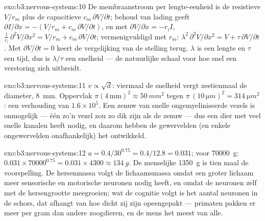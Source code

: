 \begin{solution}{exo:b3:nervous-systems:10}
De membraanstroom per lengte-eenheid is de resistieve $V/r_{m}$ plus
de capacitieve $c_{m}\,\partial V/\partial t$; behoud van lading geeft
$\partial I/\partial x = -(V/r_{m} + c_{m}\,\partial V/\partial t)$, en
met $\partial V/\partial x = -r_{i}I$, $\frac{1}{r_{i}}\,\partial^{2}V/
\partial x^{2} = V/r_{m} + c_{m}\,\partial V/\partial t$; vermenigvuldigd met
$r_{m}$: $\lambda^{2}\,\partial^{2}V/\partial x^{2} = V + \tau\,\partial
V/\partial t$. Met $\partial V/\partial t = 0$ keert de vergelijking
van de stelling terug. $\lambda$ is een lengte en $\tau$ een tijd, dus
is $\lambda/\tau$ een snelheid --- de natuurlijke schaal voor hoe snel
een verstoring zich uitbreidt.
\end{solution}

\begin{solution}{exo:b3:nervous-systems:11}
$v \propto \sqrt{d}$: viermaal de snelheid vergt zestienmaal de
diameter, \qty{8}{mm}. Oppervlak $\pi(4\,\text{mm})^{2} \approx \qty{50}{mm^2}$
tegen $\pi\,(10\,\unit{\micro m})^{2} = \qty{314}{\micro m^2}$: een verhouding van
$1.6\times 10^{5}$. Een zenuw van snelle ongemyeliniseerde vezels is
onmogelijk --- één zo'n vezel zou zo dik zijn als de zenuw --- dus een
dier met veel snelle kanalen heeft  nodig, en daarom hebben de
gewervelden (en enkele ongewervelden onafhankelijk) het ontwikkeld.
\end{solution}

\begin{solution}{exo:b3:nervous-systems:12}
$a = 0.4/30^{0.75} = 0.4/12.8 = 0.031$; voor \qty{70000}{g}: $0.031\times
\num{70000}^{0.75} = 0.031\times 4300 \approx \qty{134}{g}$. De
menselijke \qty{1350}{g} is tien maal de voorspelling. De hersenmassa
volgt de lichaamsmassa omdat een groter lichaam meer sensorische en
motorische neuronen nodig heeft, en omdat de neuronen zelf met de
hersengrootte meegroeien; wat de cognitie volgt is het aantal neuronen
in de schors, dat afhangt van hoe dicht zij zijn opeengepakt ---
primaten pakken er meer per gram dan andere zoogdieren, en de mens het
meest van alle.
\end{solution}

